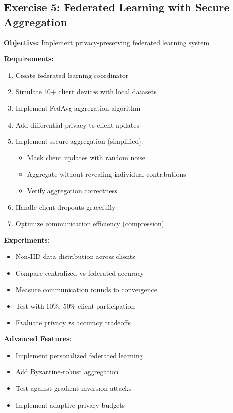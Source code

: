 \subsection{Exercise 5: Federated Learning with Secure Aggregation}

\textbf{Objective:} Implement privacy-preserving federated learning system.

\textbf{Requirements:}
\begin{enumerate}
    \item Create federated learning coordinator
    \item Simulate 10+ client devices with local datasets
    \item Implement FedAvg aggregation algorithm
    \item Add differential privacy to client updates
    \item Implement secure aggregation (simplified):
    \begin{itemize}
        \item Mask client updates with random noise
        \item Aggregate without revealing individual contributions
        \item Verify aggregation correctness
    \end{itemize}
    \item Handle client dropouts gracefully
    \item Optimize communication efficiency (compression)
\end{enumerate}

\textbf{Experiments:}
\begin{itemize}
    \item Non-IID data distribution across clients
    \item Compare centralized vs federated accuracy
    \item Measure communication rounds to convergence
    \item Test with 10\%, 50\% client participation
    \item Evaluate privacy vs accuracy tradeoffs
\end{itemize}

\textbf{Advanced Features:}
\begin{itemize}
    \item Implement personalized federated learning
    \item Add Byzantine-robust aggregation
    \item Test against gradient inversion attacks
    \item Implement adaptive privacy budgets
\end{itemize}

